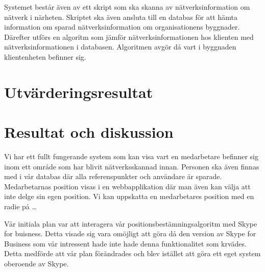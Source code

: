 \documentclass[swedish, a4paper,12pt]{article}
\begin{document}
\fi
Systemet består även av ett skript som ska skanna av nätverksinformation om nätverk i närheten. Skriptet ska även ansluta till en databas för att hämta information om sparad nätverksinformation om organisationens byggnader. Därefter utförs en algoritm som jämför nätverksinformationen hos klienten med nätverksinformationen i databasen. Algoritmen avgör då vart i byggnaden klientenheten befinner sig.

\section{Utvärderingsresultat}

\section{Resultat och diskussion}

Vi har ett fullt fungerande system som kan visa vart en medarbetare befinner sig inom ett område som har blivit nätverksskannad innan. Personen ska även finnas med i vår databas där alla referenspunkter och användare är sparade. Medarbetarnas position visas i en webbapplikation där man även kan välja att inte delge sin egen position. Vi kan uppskatta en medarbetares position med en radie på \ldots %

Vår initiala plan var att interagera vår positionsbestämningsalgoritm med Skype for buisness. Detta visade sig vara omöjligt att göra då den version av Skype for Business som vår intressent hade inte hade denna funktionalitet som krvädes. Detta medförde att vår plan förändrades och blev istället att göra ett eget system oberoende av Skype.
\end{document}
